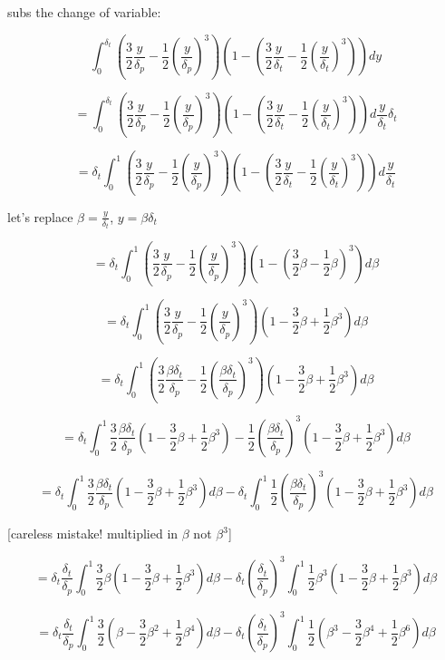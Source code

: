 \documentclass[11pt]{article}
\begin{document}
subs the change of variable:


$$\int_{0}^{\delta_t} (\frac{3}{2} \frac{y}{\delta_p} - \frac{1}{2} (\frac{y}{\delta_p})^3)(1-(\frac{3}{2} \frac{y}{\delta_t} - \frac{1}{2} (\frac{y}{\delta_t})^3)) dy$$

$$=\int_{0}^{\delta_t} (\frac{3}{2} \frac{y}{\delta_p} - \frac{1}{2} (\frac{y}{\delta_p})^3)(1-(\frac{3}{2} \frac{y}{\delta_t} - \frac{1}{2} (\frac{y}{\delta_t})^3)) d \frac{y}{\delta_t} \delta_t $$

$$= \delta_t  \int_{0}^{1} (\frac{3}{2} \frac{y}{\delta_p} - \frac{1}{2} (\frac{y}{\delta_p})^3)(1-(\frac{3}{2} \frac{y}{\delta_t} - \frac{1}{2} (\frac{y}{\delta_t})^3)) d \frac{y}{\delta_t} $$

let's replace $\beta = \frac{y}{\delta_t}$, $y=\beta \delta_t$

$$= \delta_t  \int_{0}^{1} (\frac{3}{2} \frac{y}{\delta_p} - \frac{1}{2} (\frac{y}{\delta_p})^3)(1-(\frac{3}{2} \beta- \frac{1}{2} \beta)^3) d \beta $$


$$= \delta_t  \int_{0}^{1} (\frac{3}{2} \frac{y}{\delta_p} - \frac{1}{2} (\frac{y}{\delta_p})^3)(1-\frac{3}{2} \beta + \frac{1}{2} \beta^3) d \beta $$

$$= \delta_t  \int_{0}^{1} (\frac{3}{2} \frac{\beta \delta_t}{\delta_p} - \frac{1}{2} (\frac{\beta \delta_t}{\delta_p})^3)(1-\frac{3}{2} \beta + \frac{1}{2} \beta^3) d \beta $$

$$= \delta_t  \int_{0}^{1} \frac{3}{2} \frac{\beta \delta_t}{\delta_p} (1-\frac{3}{2} \beta + \frac{1}{2} \beta^3) - \frac{1}{2} (\frac{\beta \delta_t}{\delta_p})^3(1-\frac{3}{2} \beta + \frac{1}{2} \beta^3) d \beta $$

$$= \delta_t  \int_{0}^{1} \frac{3}{2} \frac{\beta \delta_t}{\delta_p} (1-\frac{3}{2} \beta + \frac{1}{2} \beta^3) d \beta  - \delta_t  \int_{0}^{1} \frac{1}{2} (\frac{\beta \delta_t}{\delta_p})^3(1-\frac{3}{2} \beta + \frac{1}{2} \beta^3) d \beta $$

[careless mistake! multiplied in $\beta$ not $\beta^3$]

$$= \delta_t \frac{\delta_t}{\delta_p} \int_{0}^{1} \frac{3}{2} \beta  (1-\frac{3}{2} \beta + \frac{1}{2} \beta^3) d \beta  - \delta_t (\frac{ \delta_t}{\delta_p})^3 \int_{0}^{1} \frac{1}{2}\beta^3 (1-\frac{3}{2} \beta + \frac{1}{2} \beta^3) d \beta $$

$$= \delta_t \frac{\delta_t}{\delta_p} \int_{0}^{1} \frac{3}{2}   (\beta-\frac{3}{2} \beta^2 + \frac{1}{2} \beta^4) d \beta  - \delta_t (\frac{ \delta_t}{\delta_p})^3 \int_{0}^{1} \frac{1}{2} (\beta^3-\frac{3}{2} \beta^4 + \frac{1}{2} \beta^6) d \beta $$
\end{document}
